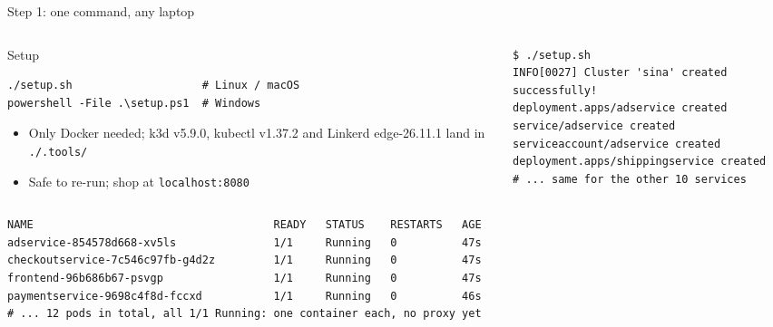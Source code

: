 \documentclass[9pt,aspectratio=169]{beamer}
\begin{document}
\begin{frame}[fragile]{Step 1: one command, any laptop}
  \begin{columns}[T,onlytextwidth]
    \begin{column}{0.44\textwidth}
      \begin{block}{Setup}
\begin{lstlisting}
./setup.sh                    # Linux / macOS
powershell -File .\setup.ps1  # Windows
\end{lstlisting}
        \begin{itemize}\setlength{\itemsep}{2pt}
          \item Only Docker needed; k3d v5.9.0, kubectl v1.37.2 and Linkerd edge-26.11.1 land in \texttt{./.tools/}
          \item Safe to re-run; shop at \texttt{localhost:8080}
        \end{itemize}
      \end{block}
    \end{column}
    \begin{column}{0.54\textwidth}
\begin{lstlisting}[language={}, morecomment={[l]{\#}}, basicstyle=\ttfamily\fontsize{6}{7.2}\selectfont]
$ ./setup.sh
INFO[0027] Cluster 'sina' created successfully!
deployment.apps/adservice created
service/adservice created
serviceaccount/adservice created
deployment.apps/shippingservice created
# ... same for the other 10 services
\end{lstlisting}
    \end{column}
  \end{columns}
  \vspace{4pt}
\begin{lstlisting}[language={}, morecomment={[l]{\#}}, basicstyle=\ttfamily\fontsize{6}{7.2}\selectfont]
NAME                                     READY   STATUS    RESTARTS   AGE
adservice-854578d668-xv5ls               1/1     Running   0          47s
checkoutservice-7c546c97fb-g4d2z         1/1     Running   0          47s
frontend-96b686b67-psvgp                 1/1     Running   0          47s
paymentservice-9698c4f8d-fccxd           1/1     Running   0          46s
# ... 12 pods in total, all 1/1 Running: one container each, no proxy yet
\end{lstlisting}
\end{frame}
\end{document}

